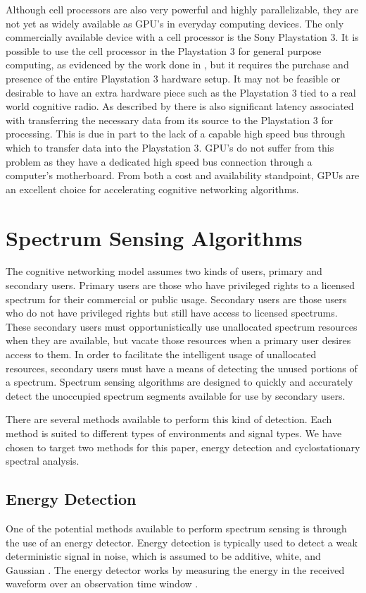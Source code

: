 Although cell processors are also very powerful and highly parallelizable, they are not yet as widely available as GPU's in everyday computing devices.  The only commercially available device with a cell processor is the Sony Playstation 3.  It is possible to use the cell processor in the Playstation 3 for general purpose computing, as evidenced by the work done in \cite{FenBos07}, but it requires the purchase and presence of the entire Playstation 3 hardware setup.  It may not be feasible or desirable to have an extra hardware piece such as the Playstation 3 tied to a real world cognitive radio.  As described by \cite{FenBos07} there is also significant latency associated with transferring the necessary data from its source to the Playstation 3 for processing.  This is due in part to the lack of a capable high speed bus through which to transfer data into the Playstation 3.  GPU's do not suffer from this problem as they have a dedicated high speed bus connection through a computer's motherboard.  From both a cost and availability standpoint, GPUs are an excellent choice for accelerating cognitive networking algorithms.


\section{Spectrum Sensing Algorithms}
\label{sect:gpu_spect_sensing_algos}
The cognitive networking model assumes two kinds of users, primary and secondary users.  Primary users are those who have privileged rights to a licensed spectrum for their commercial or public usage.  Secondary users are those users who do not have privileged rights but still have access to licensed spectrums.  These secondary users must opportunistically use unallocated spectrum resources when they are available, but vacate those resources when a primary user desires access to them.  In order to facilitate the intelligent usage of unallocated resources, secondary users must have a means of detecting the unused portions of a spectrum.  Spectrum sensing algorithms are designed to quickly and accurately detect the unoccupied spectrum segments available for use by secondary users.

There are several methods available to perform this kind of detection.  Each method is suited to different types of environments and signal types.  We have chosen to target two methods for this paper, energy detection and cyclostationary spectral analysis.

\subsection{Energy Detection}
\label{sect:energy_detect}
One of the potential methods available to perform spectrum sensing is through the use of an energy detector.  Energy detection is typically used to detect a weak deterministic signal in noise, which is assumed to be additive, white, and Gaussian \cite{CabTkaBro06}.  The energy detector works by measuring the energy in the received waveform over an observation time window \cite{CabTkaBro06}.

